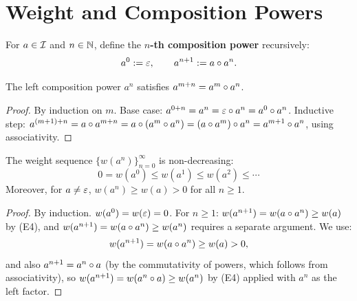 \section{Weight and Composition Powers}

\begin{definition}
For $a \in \mathcal{I}$ and $n \in \mathbb{N}$, define the \textbf{$n$-th composition
power} recursively:
\[
    a^0 := \varepsilon, \qquad a^{n+1} := a \circ a^n.
\]
\end{definition}

\begin{proposition}
The left composition power $a^n$ satisfies $a^{m+n} = a^m \circ a^n$.
\end{proposition}
\begin{proof}
By induction on $m$. Base case: $a^{0+n} = a^n = \varepsilon \circ a^n =
a^0 \circ a^n$. Inductive step: $a^{(m+1)+n} = a \circ a^{m+n} =
a \circ (a^m \circ a^n) = (a \circ a^m) \circ a^n =
a^{m+1} \circ a^n$, using associativity.
\end{proof}

\begin{theorem}\label{thm:weight-powers}
The weight sequence $\{w(a^n)\}_{n=0}^{\infty}$ is non-decreasing:
\[
    0 = w(a^0) \leq w(a^1) \leq w(a^2) \leq \cdots
\]
Moreover, for $a \neq \varepsilon$, $w(a^n) \geq w(a) > 0$ for all $n \geq 1$.
\end{theorem}
\begin{proof}
By induction. $w(a^0) = w(\varepsilon) = 0$. For $n \geq 1$:
$w(a^{n+1}) = w(a \circ a^n) \geq w(a)$ by (E4), and
$w(a^{n+1}) = w(a \circ a^n) \geq w(a^n)$ requires a separate
argument. We use:
\[
    w(a^{n+1}) = w(a \circ a^n) \geq w(a) > 0,
\]
and also $a^{n+1} = a^n \circ a$ (by the commutativity of powers,
which follows from associativity), so
$w(a^{n+1}) = w(a^n \circ a) \geq w(a^n)$ by (E4) applied with
$a^n$ as the left factor.
\end{proof}

